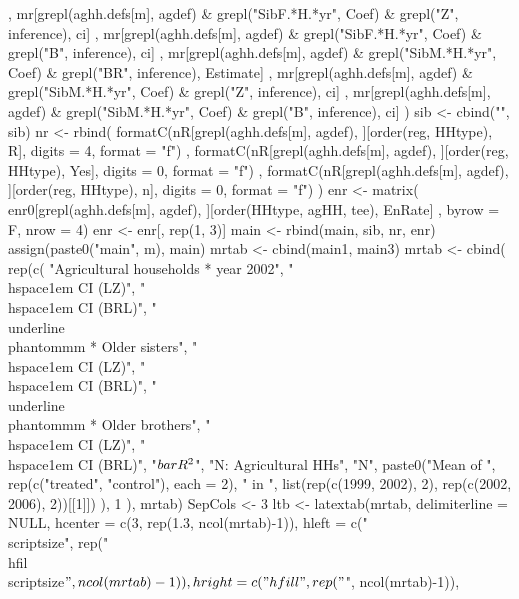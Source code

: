 \begin{Schunk}
\begin{Sinput}
{{       , 
       mr[grepl(aghh.defs[m], agdef) & grepl("SibF.*H.*yr", Coef) & grepl("Z", inference), ci]
       ,
       mr[grepl(aghh.defs[m], agdef) & grepl("SibF.*H.*yr", Coef) & grepl("B", inference), ci]
       ,
       mr[grepl(aghh.defs[m], agdef) & grepl("SibM.*H.*yr", Coef) & grepl("BR", inference), Estimate]
       , 
       mr[grepl(aghh.defs[m], agdef) & grepl("SibM.*H.*yr", Coef) & grepl("Z", inference), ci]
       ,
       mr[grepl(aghh.defs[m], agdef) & grepl("SibM.*H.*yr", Coef) & grepl("B", inference), ci]
     )
     sib <- cbind("", sib)
     nr <- rbind(
        formatC(nR[grepl(aghh.defs[m], agdef), ][order(reg, HHtype), R], digits = 4, format = "f")
      , formatC(nR[grepl(aghh.defs[m], agdef), ][order(reg, HHtype), Yes], digits = 0, format = "f")
      , formatC(nR[grepl(aghh.defs[m], agdef), ][order(reg, HHtype), n], digits = 0, format = "f")
     )
     enr <- matrix(
       enr0[grepl(aghh.defs[m], agdef), ][order(HHtype, agHH, tee), EnRate]
       , byrow = F, nrow = 4)
     enr <- enr[, rep(1, 3)]
     main <- rbind(main, sib, nr, enr)
     assign(paste0("main", m), main)
  }
  mrtab <- cbind(main1, main3)
  mrtab <- 
    cbind(
        rep(c(
          "Agricultural households * year 2002", 
          "\\hspace{1em} CI (LZ)", "\\hspace{1em} CI (BRL)", 
          "\\underline{\\phantom{mm}} * Older sisters",
          "\\hspace{1em} CI (LZ)", "\\hspace{1em} CI (BRL)", 
          "\\underline{\\phantom{mm}} * Older brothers",
          "\\hspace{1em} CI (LZ)", "\\hspace{1em} CI (BRL)", 
          "$\\bar{R}^{2}$", "N: Agricultural HHs", "N",
          paste0("Mean of ", rep(c("treated", "control"), each = 2), " in ", 
            list(rep(c(1999, 2002), 2), rep(c(2002, 2006), 2))[[1]])
           ), 1
        ), 
     mrtab)
  SepCols <- 3
  ltb <- latextab(mrtab, delimiterline = NULL, 
      hcenter = c(3, rep(1.3, ncol(mrtab)-1)),
      hleft = c("\\scriptsize", rep("\\hfil\\scriptsize$", ncol(mrtab)-1)), 
      hright = c("\\hfill", rep("$", ncol(mrtab)-1)),
}
\end{Sinput}
\end{Schunk}
